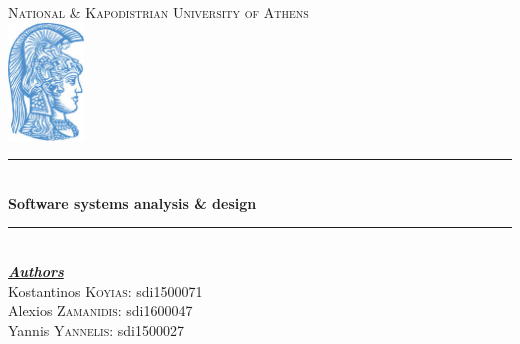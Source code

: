 \documentclass[12pt]{article}
\begin{document}
\begin{titlepage}

\newcommand{\HRule}{\rule{\linewidth}{0.5mm}} %

\center %

\textsc{\huge National \& Kapodistrian University of Athens}\\[1.5cm] %
\includegraphics[width=20mm,scale=0.5]{logo.jpeg}\\


\HRule \\[0.4cm]
{ \large \bfseries Software systems analysis \& design}\\[0.4cm] %
\HRule \\[1.5cm]
 

\large \emph{\textbf{\underline{Authors}}}\\
Kostantinos \textsc{Koyias}: sdi1500071\\
Alexios \textsc{Zamanidis}: sdi1600047\\
Yannis \textsc{Yannelis}: sdi1500027

 

\vfill %

\end{titlepage}
\end{document}
